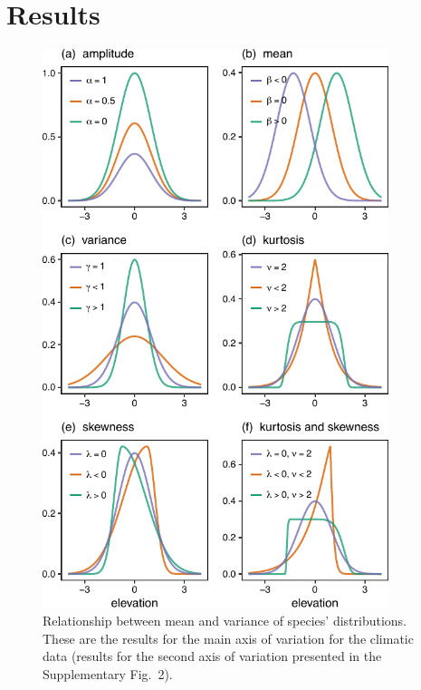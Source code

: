\documentclass[11pt, a4paper]{article}
\begin{document}
\section*{Results}
\begin{figure}[ht]
  \centering
    \vspace{0.5cm}
    \includegraphics[width=0.9\textwidth]{figures/figure1}
    	  \vspace{0.3cm}
	   \caption{Relationship between mean and variance of species' distributions. These are the results for the main axis of variation for the climatic data (results for the second axis of variation presented in the Supplementary Fig.~2).}
      \label{fig:correlation}
\end{figure}
\end{document}

